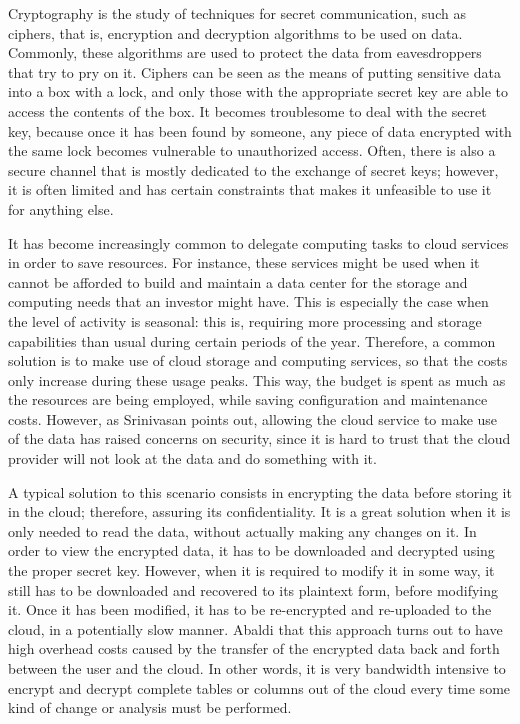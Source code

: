 Cryptography is the study of techniques for secret communication, such as ciphers, that is, encryption and decryption algorithms to be used on data. Commonly, these algorithms are used to protect the data from eavesdroppers that try to pry on it. Ciphers can be seen as the means of putting sensitive data into a box with a lock, and only those with the appropriate secret key are able to access the contents of the box. It becomes troublesome to deal with the secret key, because once it has been found by someone, any piece of data encrypted with the same lock becomes vulnerable to unauthorized access. Often, there is also a secure channel that is mostly dedicated to the exchange of secret keys; however, it is often limited and has certain constraints that makes it unfeasible to use it for anything else.

It has become increasingly common to delegate computing tasks to cloud services in order to save resources. For instance, these services might be used when it cannot be afforded to build and maintain a data center for the storage and computing needs that an investor might have. This is especially the case when the level of activity is seasonal: this is, requiring more processing and storage capabilities than usual during certain periods of the year. Therefore, a common solution is to make use of cloud storage and computing services, so that the costs only increase during these usage peaks. This way, the budget is spent as much as the resources are being employed, while saving configuration and maintenance costs. However, as Srinivasan \cite{Srinivasan:2012:SCC:2345396.2345474} points out, allowing the cloud service to make use of the data has raised concerns on security, since it is hard to trust that the cloud provider will not look at the data and do something with it.

A typical solution to this scenario consists in encrypting the data before storing it in the cloud; therefore, assuring its confidentiality. It is a great solution when it is only needed to read the data, without actually making any changes on it. In order to view the encrypted data, it has to be downloaded and decrypted using the proper secret key. However, when it is required to modify it in some way, it still has to be downloaded and recovered to its plaintext form, before modifying it. Once it has been modified, it has to be re-encrypted and re-uploaded to the cloud, in a potentially slow manner. Abaldi \cite{abadi2009data} that this approach turns out to have high overhead costs caused by the transfer of the encrypted data back and forth between the user and the cloud. In other words, it is very bandwidth intensive to encrypt and decrypt complete tables or columns out of the cloud every time some kind of change or analysis must be performed.

